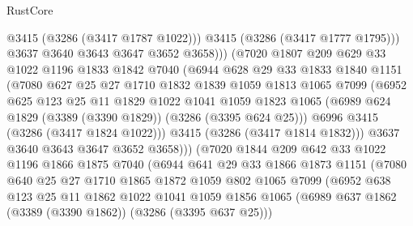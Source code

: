 \begin{lexlean}{RustCore}
\begin{coremodule}
                        @3415
                        (@3286 (@3417 @1787 @1022)))
                      @3415
                      (@3286 (@3417 @1777 @1795)))
                    @3637
                    @3640
                    @3643
                    @3647
                    @3652
                    @3658)))
              (@7020
                @1807
                @209
                @629
                @33
                @1022
                @1196
                @1833
                @1842
                @7040
                (@6944
                  @628
                  @29
                  @33
                  @1833
                  @1840
                  @1151
                  (@7080
                    @627
                    @25
                    @27
                    @1710
                    @1832
                    @1839
                    @1059
                    @1813
                    @1065
                    @7099
                    (@6952
                      @625
                      @123
                      @25
                      @11
                      @1829
                      @1022
                      @1041
                      @1059
                      @1823
                      @1065
                      (@6989 @624 @1829 (@3389 (@3390 @1829)) (@3286 (@3395 @624 @25)))
                      @6996
                      @3415
                      (@3286 (@3417 @1824 @1022)))
                    @3415
                    (@3286 (@3417 @1814 @1832)))
                  @3637
                  @3640
                  @3643
                  @3647
                  @3652
                  @3658)))
            (@7020
              @1844
              @209
              @642
              @33
              @1022
              @1196
              @1866
              @1875
              @7040
              (@6944
                @641
                @29
                @33
                @1866
                @1873
                @1151
                (@7080
                  @640
                  @25
                  @27
                  @1710
                  @1865
                  @1872
                  @1059
                  @802
                  @1065
                  @7099
                  (@6952
                    @638
                    @123
                    @25
                    @11
                    @1862
                    @1022
                    @1041
                    @1059
                    @1856
                    @1065
                    (@6989 @637 @1862 (@3389 (@3390 @1862)) (@3286 (@3395 @637 @25)))

\end{coremodule}
\end{lexlean}
